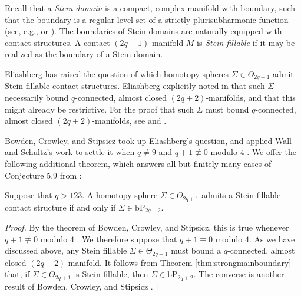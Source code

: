 
Recall that a \emph{Stein domain} is a compact, complex manifold with boundary, such that the boundary is a regular level set of a strictly plurisubharmonic function (see, e.g., \cite[p.1-3]{SteinFillable} or \cite{SteinBook}).  The boundaries of Stein domains are naturally equipped with contact structures.  A contact $(2q+1)$-manifold $M$ is \emph{Stein fillable} if it may be realized as the boundary of a Stein domain.

Eliashberg has raised the question \cite[3.8]{ContactWorkshop} of which homotopy spheres $\Sigma \in \Theta_{2q+1}$ admit Stein fillable contact structures.  Eliashberg explicitly noted in \cite[3.8]{ContactWorkshop} that such $\Sigma$ necessarily bound $q$-connected, almost closed $(2q+2)$-manifolds, and that this might already be restrictive. For the proof that such $\Sigma$ must bound $q$-connected, almost closed $(2q+2)$-manifolds, see \cite[Proof of Theorem 5.4]{SteinFillable} and \cite[1.2.2]{EliTopChar}.

Bowden, Crowley, and Stipsicz took up Eliashberg's question, and applied Wall and Schultz's work \cite{Wall62, Wall67, Schultz} to settle it when $q \ne 9$ and $q+1 \not \equiv 0$ modulo $4$ \cite[Theorem 5.4]{SteinFillable}.  We offer the following additional theorem, which answers all but finitely many cases of Conjecture 5.9 from \cite{SteinFillable}:

\begin{thm} \label{app:SteinFillable}
Suppose that $q>123$.  A homotopy sphere $\Sigma \in \Theta_{2q+1}$ admits a Stein fillable contact structure if and only if $\Sigma \in \mathrm{bP}_{2q+2}$.  
\end{thm}

\begin{proof}
By the theorem of Bowden, Crowley, and Stipsicz, this is true whenever $q+1 \not \equiv 0$ modulo $4$ \cite[Theorem 5.4]{SteinFillable}.  We therefore suppose that $q+1 \equiv 0$ modulo $4$.  As we have discussed above, any Stein fillable $\Sigma \in \Theta_{2q+1}$ must bound a $q$-connected, almost closed $(2q+2)$-manifold.  It follows from Theorem \ref{thm:strongmainboundary} that, if $\Sigma \in \Theta_{2q+1}$ is Stein fillable, then $\Sigma \in \mathrm{bP}_{2q+2}$.  The converse is another result of Bowden, Crowley, and Stipsicz \cite[Proposition 5.3]{SteinFillable}.
\end{proof}


